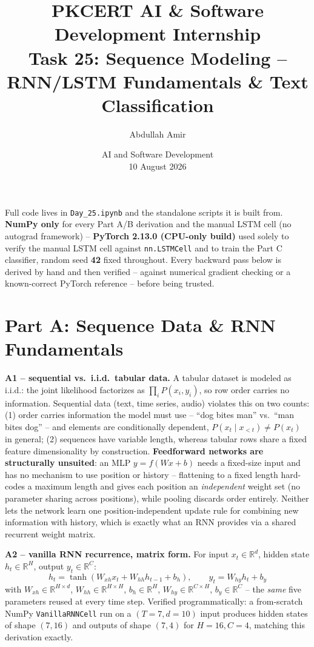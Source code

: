 \documentclass[11pt,a4paper]{article}
\title{\vspace{-1.5cm}\textbf{PKCERT AI \& Software Development Internship \\ Task 25: Sequence Modeling -- RNN/LSTM Fundamentals \& Text Classification}}
\author{Abdullah Amir}
\date{AI and Software Development \\ 10 August 2026}
\begin{document}
\maketitle
\vspace{-0.8cm}

Full code lives in \texttt{Day\_25.ipynb} and the standalone scripts it is built from.
\textbf{NumPy only} for every Part A/B derivation and the manual LSTM cell (no autograd
framework) -- \textbf{PyTorch 2.13.0 (CPU-only build)} used solely to verify the manual LSTM
cell against \texttt{nn.LSTMCell} and to train the Part C classifier, random seed
\textbf{42} fixed throughout. Every backward pass below is derived by hand and then verified
-- against numerical gradient checking or a known-correct PyTorch reference -- before being
trusted.

\section*{Part A: Sequence Data \& RNN Fundamentals}

\textbf{A1 -- sequential vs.\ i.i.d.\ tabular data.} A tabular dataset is modeled as i.i.d.:
the joint likelihood factorizes as $\prod_i P(x_i,y_i)$, so row order carries no information.
Sequential data (text, time series, audio) violates this on two counts: (1) order carries
information the model must use -- ``dog bites man'' vs.\ ``man bites dog'' -- and elements are
conditionally dependent, $P(x_t \mid x_{<t}) \neq P(x_t)$ in general; (2) sequences have
variable length, whereas tabular rows share a fixed feature dimensionality by construction.
\textbf{Feedforward networks are structurally unsuited}: an MLP $y=f(Wx+b)$ needs a
fixed-size input and has no mechanism to use position or history -- flattening to a fixed
length hard-codes a maximum length and gives each position an \emph{independent} weight set
(no parameter sharing across positions), while pooling discards order entirely. Neither lets
the network learn one position-independent update rule for combining new information with
history, which is exactly what an RNN provides via a shared recurrent weight matrix.

\textbf{A2 -- vanilla RNN recurrence, matrix form.} For input $x_t \in \mathbb{R}^d$, hidden
state $h_t \in \mathbb{R}^H$, output $y_t \in \mathbb{R}^C$:
$$h_t = \tanh(W_{xh} x_t + W_{hh} h_{t-1} + b_h), \qquad y_t = W_{hy} h_t + b_y$$
with $W_{xh}\in\mathbb{R}^{H\times d}$, $W_{hh}\in\mathbb{R}^{H\times H}$, $b_h\in\mathbb{R}^H$,
$W_{hy}\in\mathbb{R}^{C\times H}$, $b_y\in\mathbb{R}^C$ -- the \emph{same} five parameters
reused at every time step. Verified programmatically: a from-scratch NumPy
\texttt{VanillaRNNCell} run on a $(T{=}7, d{=}10)$ input produces hidden states of shape
$(7,16)$ and outputs of shape $(7,4)$ for $H{=}16, C{=}4$, matching this derivation exactly.
\end{document}
